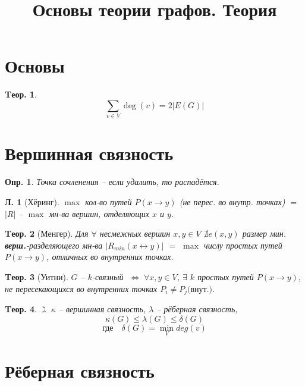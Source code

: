 \documentclass[a4paper,12pt]{article}
\title{Основы теории графов. Теория}
\author{}
\date{}
\newtheorem{definition}{Опр.}[section]
\newtheorem{theorem}{Tеор.}[section]
\newtheorem{lemma}{Л.}[theorem]
\def\ilet{$\gimel\;$}
\def\iiff{$\;\Longleftrightarrow\;$}
\begin{document}
\maketitle

\section{Основы}

\begin{theorem}
	\[ \sum_{v \in V} \deg(v) = 2 |E(G)|  \]
\end{theorem}

\section{Вершинная связность}

\begin{definition}
	Точка сочленения -- если удалить, то распадётся.
\end{definition}

\begin{lemma}[Хёринг]
	$\max$ кол-во путей $P(x \rightarrow y)$ (не перес. во внутр. точках) $=$ $|R|$ -- $\max$ мн-ва вершин, отделяющих $x$ и $y$.
\end{lemma}

\begin{theorem}[Менгер]
	Для $\forall$ несмежных вершин $x,y \in V$ $\nexists e(x,y)$ размер мин. \textbf{верш.}-разделяющего мн-ва $|R_{min}(x \leftrightarrow y)|$ $=$ $\max$ числу простых путей $P(x \rightarrow y)$, отличных во внутренних точках.
\end{theorem}

\begin{theorem}[Уитни]
	$G$ -- $k$-связный \iiff $\forall x,y \in V$, $\exists$ $k$ простых путей $P(x \rightarrow y)$, не пересекающихся во внутренних точках $P_i \neq P_j \text{(внут.)}$.
\end{theorem}

\begin{theorem}
	\ilet $\kappa$ -- вершинная связность, $\lambda$ -- рёберная связность,
	\[ \kappa(G) \leqslant \lambda(G) \leqslant \delta(G) \]
	\[ \text{где} \quad \delta(G) = \min_V deg(v) \]
\end{theorem}

\section{Рёберная связность}
\end{document}
